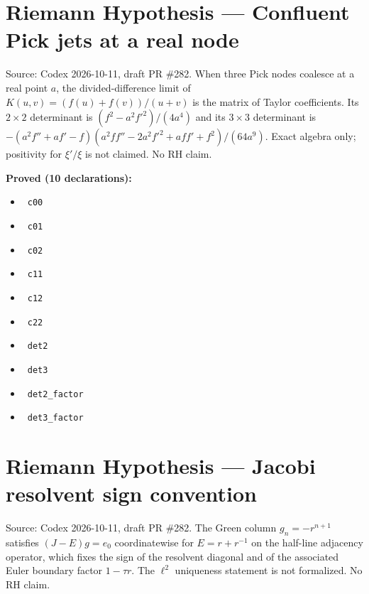 \documentclass{report}
\theoremstyle{definition}
\begin{document}
\section{Riemann Hypothesis --- Confluent Pick jets at a real node}
Source: Codex 2026-10-11, draft PR \#282. When three Pick nodes coalesce at a real point $a$, the divided-difference limit of $K(u,v)=(f(u)+f(v))/(u+v)$ is the matrix of Taylor coefficients. Its $2\times2$ determinant is $(f^2-a^2f'^2)/(4a^4)$ and its $3\times3$ determinant is $-(a^2f''+af'-f)(a^2ff''-2a^2f'^2+aff'+f^2)/(64a^9)$. Exact algebra only; positivity for $\xi'/\xi$ is not claimed. No RH claim.

\noindent\textbf{Proved (10 declarations):}
\begin{itemize}
  \item {}\leanok\ \texttt{c00}
  \item {}\leanok\ \texttt{c01}
  \item {}\leanok\ \texttt{c02}
  \item {}\leanok\ \texttt{c11}
  \item {}\leanok\ \texttt{c12}
  \item {}\leanok\ \texttt{c22}
  \item {}\leanok\ \texttt{det2}
  \item {}\leanok\ \texttt{det3}
  \item {}\leanok\ \texttt{det2\_factor}
  \item {}\leanok\ \texttt{det3\_factor}
\end{itemize}

\section{Riemann Hypothesis --- Jacobi resolvent sign convention}
Source: Codex 2026-10-11, draft PR \#282. The Green column $g_n=-r^{n+1}$ satisfies $(J-E)g=e_0$ coordinatewise for $E=r+r^{-1}$ on the half-line adjacency operator, which fixes the sign of the resolvent diagonal and of the associated Euler boundary factor $1-\tau r$. The $\ell^2$ uniqueness statement is not formalized. No RH claim.
\end{document}
